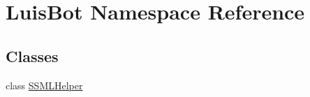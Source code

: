 \hypertarget{namespace_luis_bot}{}\section{Luis\+Bot Namespace Reference}
\label{namespace_luis_bot}
\subsection*{Classes}
\begin{DoxyCompactItemize}
\item 
class \hyperlink{class_luis_bot_1_1_s_s_m_l_helper}{S\+S\+M\+L\+Helper}
\end{DoxyCompactItemize}
